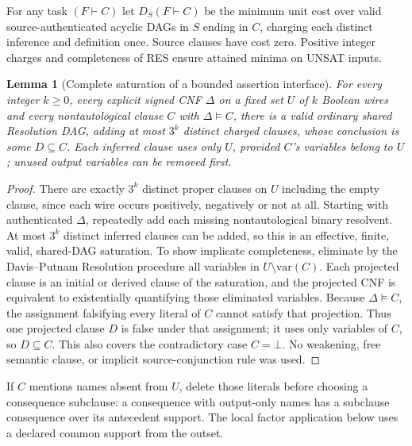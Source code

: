 \documentclass[11pt]{article}
\newtheorem{lemma}[theorem]{Lemma}
\begin{document}
For any task $(F\vdash C)$ let $D_S(F\vdash C)$ be the minimum unit cost over valid source-authenticated acyclic DAGs in $S$ ending in $C$, charging each distinct inference and definition once. Source clauses have cost zero. Positive integer charges and completeness of RES ensure attained minima on UNSAT inputs.

\begin{lemma}[Complete saturation of a bounded assertion interface]
For every integer $k\ge0$, every explicit signed CNF $\Delta$ on a fixed set $U$ of $k$ Boolean wires and every nontautological clause $C$ with $\Delta\models C$, there is a valid ordinary shared Resolution DAG, adding at most $3^k$ distinct charged clauses, whose conclusion is some $D\subseteq C$. Each inferred clause uses only $U$, provided $C$'s variables belong to $U$; unused output variables can be removed first.
\end{lemma}
\begin{proof}
There are exactly $3^k$ distinct proper clauses on $U$ including the empty clause, since each wire occurs positively, negatively or not at all. Starting with authenticated $\Delta$, repeatedly add each missing nontautological binary resolvent. At most $3^k$ distinct inferred clauses can be added, so this is an effective, finite, valid, shared-DAG saturation. To show implicate completeness, eliminate by the Davis--Putnam Resolution procedure all variables in $U\setminus\mathrm{var}(C)$. Each projected clause is an initial or derived clause of the saturation, and the projected CNF is equivalent to existentially quantifying those eliminated variables. Because $\Delta\models C$, the assignment falsifying every literal of $C$ cannot satisfy that projection. Thus one projected clause $D$ is false under that assignment; it uses only variables of $C$, so $D\subseteq C$. This also covers the contradictory case $C=\bot$. No weakening, free semantic clause, or implicit source-conjunction rule was used.
\end{proof}
\noindent If $C$ mentions names absent from $U$, delete those literals before choosing a consequence subclause: a consequence with output-only names has a subclause consequence over its antecedent support. The local factor application below uses a declared common support from the outset.
\end{document}
